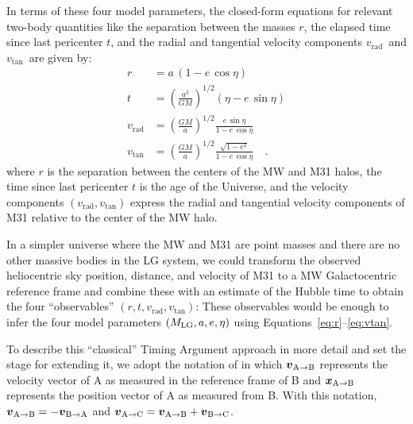 \documentclass[twocolumn]{aastex631}
\newcommand{\mlg}{\ensuremath{M_{\rm LG}}}
\newcommand{\vtan}{\ensuremath{v_\textrm{tan}}}
\newcommand{\vrad}{\ensuremath{v_\textrm{rad}}}
\newcommand{\bov}{\ensuremath{\boldsymbol{v}}}
\newcommand{\boldx}{\ensuremath{\boldsymbol{x}}}
\newcommand{\pos}[2]{\ensuremath{\boldx_{\rm #1 \to #2}}}
\newcommand{\vel}[2]{\ensuremath{\bov_{\rm #1 \to #2}}}
\begin{document}
In terms of these four model parameters, the closed-form equations for relevant
two-body quantities like the separation between the masses $r$, the elapsed time
since last pericenter $t$, and the radial and tangential velocity components
\vrad\ and \vtan\ are given by:
\begin{align}
  r &= a \, (1-e\,\cos\eta) \label{eq:r} \\
  t &= \left( \frac{a^3}{GM} \right)^{1/2}(\eta-e\,\sin\eta) \label{eq:t} \\
  \vrad &= \left( \frac{GM}{a} \right)^{1/2} \frac{e\,\sin\eta}{1-e\,\cos\eta} \label{eq:vrad} \\
  \vtan &= \left( \frac{GM}{a} \right)^{1/2} \frac{\sqrt{1-e^2}}{1-e\,\cos\eta} \label{eq:vtan} \quad .
\end{align}
where $r$ is the separation between the centers of the MW and M31 halos,
the time since last pericenter $t$ is the age of the Universe,
and the velocity components $(\vrad, \vtan)$ express the radial and tangential
velocity components of M31 relative to the center of the MW halo.

In a simpler universe where the MW and M31 are point masses and there are no
other massive bodies in the LG system, we could transform the observed
heliocentric sky position, distance, and velocity of M31 to a MW Galactocentric
reference frame and combine these with an estimate of the Hubble time to obtain
the four ``observables'' $(r, t, \vrad, \vtan)$:
These observables would be enough to infer the four model parameters $(\mlg, a,
e, \eta)$ using Equations~\ref{eq:r}--\ref{eq:vtan}.

To describe this ``classical'' Timing Argument approach in more detail and set
the stage for extending it, we adopt the notation of \citet{Penarrubia2016} in
which $\vel{A}{B}$ represents the velocity vector of A as measured in
the reference frame of B and $\pos{A}{B}$ represents the position vector of A as
measured from B.
With this notation, $\vel{A}{B} = -\vel{B}{A}$ and $\vel{A}{C} = \vel{A}{B} +
\vel{B}{C}$.
\end{document}
